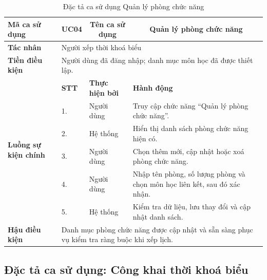 \documentclass[../DoAn.tex]{subfiles}
\begin{document}
\begin{longtable}{|p{2.8cm}|p{1cm}|p{2.8cm}|p{6.3cm}|}
\caption{Đặc tả ca sử dụng Quản lý phòng chức năng}
\label{tab:app_uc_quan_ly_phong} \\
\hline
\multicolumn{1}{|l|}{\textbf{Mã ca sử dụng}} & \multicolumn{1}{c|}{UC04} &
\multicolumn{1}{c|}{\textbf{Tên ca sử dụng}} & \multicolumn{1}{c|}{Quản lý phòng chức năng} \\
\hline
\multicolumn{1}{|l|}{\textbf{Tác nhân}} & \multicolumn{3}{l|}{Người xếp thời khoá biểu} \\
\hline
\multicolumn{1}{|l|}{\textbf{Tiền điều kiện}} & \multicolumn{3}{l|}{Người dùng đã đăng nhập; danh mục môn học đã được thiết lập.} \\
\hline
\multirow{6}{2.8cm}{\textbf{Luồng sự kiện chính}} & \textbf{STT} & \textbf{Thực hiện bởi} & \textbf{Hành động} \\
\cline{2-4}
& 1. & Người dùng & Truy cập chức năng ``Quản lý phòng chức năng''. \\
\cline{2-4}
& 2. & Hệ thống & Hiển thị danh sách phòng chức năng hiện có. \\
\cline{2-4}
& 3. & Người dùng & Chọn thêm mới, cập nhật hoặc xoá phòng chức năng. \\
\cline{2-4}
& 4. & Người dùng & Nhập tên phòng, số lượng phòng và chọn môn học liên kết, sau đó xác nhận. \\
\cline{2-4}
& 5. & Hệ thống & Kiểm tra dữ liệu, lưu thay đổi và cập nhật danh sách. \\
\hline
\multicolumn{1}{|l|}{\textbf{Hậu điều kiện}} & \multicolumn{3}{p{10.5cm}|}{Danh mục phòng chức năng được cập nhật và sẵn sàng phục vụ kiểm tra ràng buộc khi xếp lịch.} \\
\hline
\end{longtable}

\subsection{Đặc tả ca sử dụng: Công khai thời khoá biểu}
\end{document}
